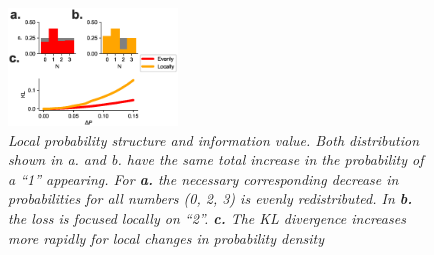 \documentclass[9pt,twocolumn,twoside]{pnas-new}
\begin{document}
\begin{figure}
\includegraphics[width=0.4\textwidth]{figures/metrics_specifity.eps}
\caption{
\textit{Local probability structure and information value. Both distribution shown in a. and b. have the same total increase in the probability of a ``1'' appearing.
For \textbf{a.}  the necessary corresponding decrease in probabilities for all numbers (0, 2, 3) is evenly redistributed.
In \textbf{b.} the loss is focused locally on ``2''. 
\textbf{c.} The KL divergence increases more rapidly for local changes in probability density}}
\label{fig:metrics_specifity}
\end{figure}
\end{document}
